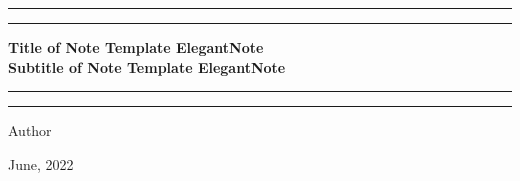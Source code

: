 

\begin{titlepage}
    \centering   %
    \vspace*{5\baselineskip}   %
    \color{ecolor}

    \rule{\textwidth}{1.6pt}\vspace*{-\baselineskip}\vspace*{2pt}  %
    \rule{\textwidth}{0.4pt}   %
	
    \vspace{0.75\baselineskip} %

    {%
    \LARGE\bfseries Title of Note Template ElegantNote   \\[20pt]
    \Large\bfseries Subtitle of Note Template ElegantNote
    }

	\vspace{0.75\baselineskip} %
	
	\rule{\textwidth}{0.4pt}\vspace*{-\baselineskip}\vspace{3.2pt} %
	\rule{\textwidth}{1.6pt}  %
	
	\vspace{4\baselineskip}   %

    {\Large Author \\[10pt] }
	
    {\Large June, 2022 \\}
	\vfill
\end{titlepage}

